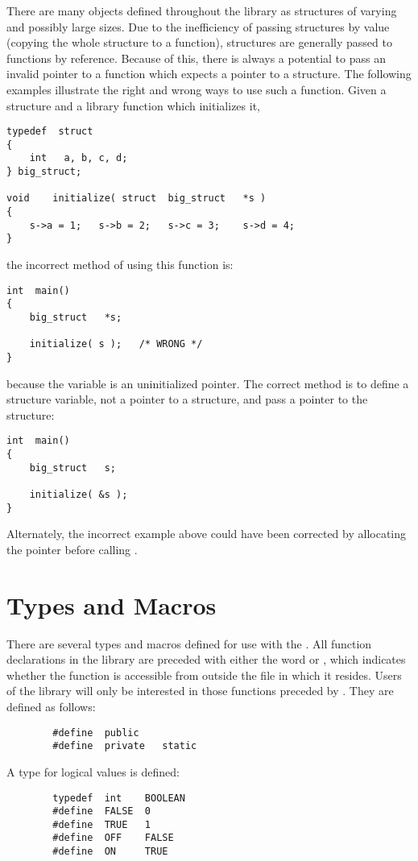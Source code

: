 There are many objects defined throughout the library as structures of
varying and possibly large sizes.  Due to the inefficiency of passing
structures by value (copying the whole structure to a function),
structures are generally passed to functions by reference.  Because of
this, there is always a potential to pass an invalid pointer to a
function which expects a pointer to a structure.  The following examples
illustrate the right and wrong ways to use such a function.  Given a
structure and a library function which initializes it,
\begin{verbatim}
typedef  struct
{
    int   a, b, c, d;
} big_struct;

void    initialize( struct  big_struct   *s )
{
    s->a = 1;   s->b = 2;   s->c = 3;    s->d = 4;
}
\end{verbatim}
the incorrect method of using this function is:
\begin{verbatim}
int  main()
{
    big_struct   *s;

    initialize( s );   /* WRONG */
}
\end{verbatim}
because the variable  is an uninitialized pointer.  The
correct method is to define a structure variable, not a pointer to a
structure, and pass a pointer to the structure:
\begin{verbatim}
int  main()
{
    big_struct   s;

    initialize( &s );
}
\end{verbatim}
Alternately, the incorrect example above could have been corrected by
allocating the  pointer before calling .

\chapter{Types and Macros}

There are several types and macros defined for use with the \vol.
All function declarations in the library are preceded with either
the word  or , which indicates whether the
function is accessible from outside the file in which it resides.
Users of the library will only be interested in those functions
preceded by .  They are defined as follows:
{\bf\begin{verbatim}
        #define  public
        #define  private   static
\end{verbatim}}

A type for logical values is defined:
{\bf\begin{verbatim}
        typedef  int    BOOLEAN
        #define  FALSE  0
        #define  TRUE   1
        #define  OFF    FALSE
        #define  ON     TRUE
\end{verbatim}}

